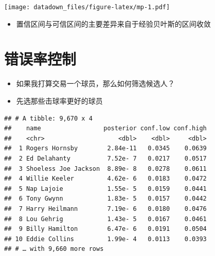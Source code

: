 \documentclass[]{book}
\newenvironment{Shaded}{\begin{snugshade}}{\end{snugshade}}
\newcommand{\CommentTok}[1]{\textcolor[rgb]{0.56,0.35,0.01}{\textit{#1}}}
\newcommand{\KeywordTok}[1]{\textcolor[rgb]{0.13,0.29,0.53}{\textbf{#1}}}
\newcommand{\NormalTok}[1]{#1}
\newcommand{\OperatorTok}[1]{\textcolor[rgb]{0.81,0.36,0.00}{\textbf{#1}}}
\newcommand{\StringTok}[1]{\textcolor[rgb]{0.31,0.60,0.02}{#1}}
\providecommand{\tightlist}{%
  \setlength{\itemsep}{0pt}\setlength{\parskip}{0pt}}
\begin{document}
\texttt{[image: datadown\_files/figure-latex/mp-1.pdf]}

\begin{itemize}
\tightlist
\item
  置信区间与可信区间的主要差异来自于经验贝叶斯的区间收敛
\end{itemize}

\hypertarget{ux9519ux8befux7387ux63a7ux5236}{%
\section{错误率控制}\label{ux9519ux8befux7387ux63a7ux5236}}

\begin{itemize}
\item
  如果我打算交易一个球员，那么如何筛选候选人？
\item
  先选那些击球率更好的球员
\end{itemize}

\begin{Shaded}
\end{Shaded}

\begin{verbatim}
## # A tibble: 9,670 x 4
##    name                 posterior conf.low conf.high
##    <chr>                    <dbl>    <dbl>     <dbl>
##  1 Rogers Hornsby        2.84e-11   0.0345    0.0639
##  2 Ed Delahanty          7.52e- 7   0.0217    0.0517
##  3 Shoeless Joe Jackson  8.89e- 8   0.0278    0.0611
##  4 Willie Keeler         4.62e- 6   0.0183    0.0472
##  5 Nap Lajoie            1.55e- 5   0.0159    0.0441
##  6 Tony Gwynn            1.83e- 5   0.0157    0.0442
##  7 Harry Heilmann        7.19e- 6   0.0180    0.0476
##  8 Lou Gehrig            1.43e- 5   0.0167    0.0461
##  9 Billy Hamilton        6.47e- 6   0.0191    0.0504
## 10 Eddie Collins         1.99e- 4   0.0113    0.0393
## # … with 9,660 more rows
\end{verbatim}
\end{document}
